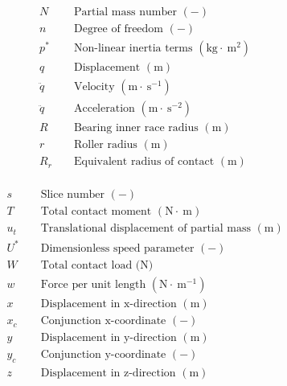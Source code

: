 \begin{align*}
	&N && \text { Partial mass number }(-) \\
	&n && \text { Degree of freedom }(-) \\
	&p^* && \text { Non-linear inertia terms }\left(\mathrm{kg} \cdot \mathrm{~m}^2\right) \\
	&q && \text { Displacement }(\mathrm{m}) \\
	&\ddot{q} && \text { Velocity }\left(\mathrm{m} \cdot \mathrm{~s}^{-1}\right) \\
	&\ddot{q} && \text { Acceleration }\left(\mathrm{m} \cdot \mathrm{~s}^{-2}\right) \\
	&R && \text { Bearing inner race radius }(\mathrm{m}) \\
	&r && \text { Roller radius }(\mathrm{m}) \\
	&R_r && \text { Equivalent radius of contact }(\mathrm{m}) \\
\end{align*}

\pagebreak

\begin{align*}
	&s && \text { Slice number }(-) \\
	&T && \text { Total contact moment }(\mathrm{N} \cdot \mathrm{~m}) \\
	&u_t && \text { Translational displacement of partial mass }(\mathrm{m}) \\
	&U^* && \text { Dimensionless speed parameter }(-) \\
	&W && \text { Total contact load (N) } \\
	&w && \text { Force per unit length }\left(\mathrm{N} \cdot \mathrm{~m}^{-1}\right) \\
	&x && \text { Displacement in x-direction }(\mathrm{m}) \\
	&x_c && \text { Conjunction } \mathrm{x} \text {-coordinate }(-) \\
	&y && \text { Displacement in y-direction }(\mathrm{m}) \\
	&y_c && \text { Conjunction y-coordinate }(-) \\
	&z && \text { Displacement in z-direction }(\mathrm{m}) \\
\end{align*}

